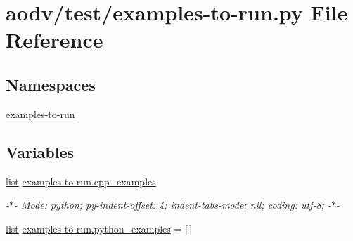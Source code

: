 \hypertarget{aodv_2test_2examples-to-run_8py}{}\section{aodv/test/examples-\/to-\/run.py File Reference}
\label{aodv_2test_2examples-to-run_8py}
\subsection*{Namespaces}
\begin{DoxyCompactItemize}
\item 
 \hyperlink{namespaceexamples-to-run}{examples-\/to-\/run}
\end{DoxyCompactItemize}
\subsection*{Variables}
\begin{DoxyCompactItemize}
\item 
\hyperlink{openflow-interface_8h_afd9bcfa176617760671b67580f536fa7}{list} \hyperlink{namespaceexamples-to-run_a72faa45e2d956385ab9962e8e63cf5ef}{examples-\/to-\/run.\+cpp\+\_\+examples}
\begin{DoxyCompactList}\small\item\em -\/$\ast$-\/ Mode\+: python; py-\/indent-\/offset\+: 4; indent-\/tabs-\/mode\+: nil; coding\+: utf-\/8; -\/$\ast$-\/ \end{DoxyCompactList}\item 
\hyperlink{openflow-interface_8h_afd9bcfa176617760671b67580f536fa7}{list} \hyperlink{namespaceexamples-to-run_a75df1bf80cc7697c5141aa53ab404bd2}{examples-\/to-\/run.\+python\+\_\+examples} = \mbox{[}$\,$\mbox{]}
\end{DoxyCompactItemize}
